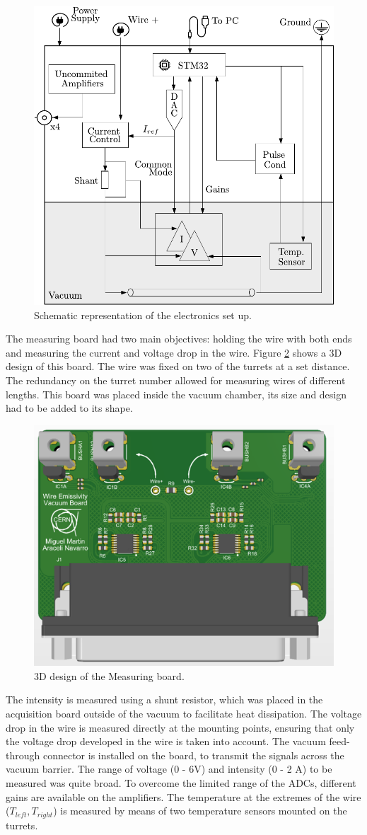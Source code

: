 \begin{figure}[h]
    \centering
    \includegraphics[width=0.65\columnwidth]{ElectronicSchema/ElectronicSchema.pdf}
    \caption{Schematic representation of the electronics set up. }
    \label{fig:SchemaElectronics}
\end{figure}

The measuring board had two main objectives: holding the wire with both ends and measuring the current and voltage drop in the wire. Figure \ref{fig:MeasuringBoard} shows a 3D design of this board. The wire was fixed on two of the turrets at a set distance. The redundancy on the turret number allowed for measuring wires of different lengths. This board was placed inside the vacuum chamber, its size and design had to be added to its shape. 

\begin{figure}[h]
    \centering
    \includegraphics[width=0.5\columnwidth]{3DBoardDesigns/MeasuringBoard.png}
    \caption{3D design of the Measuring board.}
    \label{fig:MeasuringBoard}
\end{figure}

The intensity is measured using a shunt resistor, which was placed in the acquisition board outside of the vacuum to facilitate heat dissipation. The voltage drop in the wire is measured directly at the mounting points, ensuring that only the voltage drop developed in the wire is taken into account. The vacuum feed-through connector is installed on the board, to transmit the signals across the vacuum barrier. The range of voltage (0 - 6V) and intensity (0 - 2 A) to be measured was quite broad. To overcome the limited range of the ADCs, different gains are available on the amplifiers. The temperature at the extremes of the wire ($T_{left}, T_{right}$) is measured by means of two temperature sensors mounted on the turrets. 

